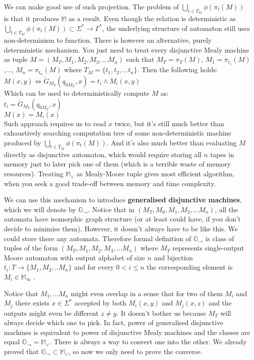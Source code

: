 \documentclass[12pt]{article}
\begin{document}
We can make good use of such projection. The problem of  $\bigcup_{t\in T_M} \phi(\pi_t(M))$ is that it produces $\mathbb{M}$ as a result. Even though the relation is deterministic as $\bigcup_{t\in T_M} \phi(\pi_t(M)) \subset \Sigma^* \rightarrow \Gamma^*$, the underlying structure of automaton still uses non-determinism to function. There is however an alternative, purely deterministic mechanism. You just need to treat every disjunctive Mealy machine as tuple $M = (M_T,M_1,M_2,M_3,...M_n)$ such that $M_T = \pi_T(M)$, $M_1 = \pi_{t_1}(M)$ ,..., $M_n = \pi_{t_n}(M)$ where $T_M = \{t_1,t_2,...t_n\}$. Then the following holds: \\
$M(x,y) \iff \check{G}_{M_T}(q_{0M_T},x) = t_i \wedge M_i(x,y)$ \\
Which can be used to deterministically compute $M$ as: \\
$t_i = \check{G}_{M_T}(q_{0M_T},x)$ \\
$M(x) = M_i(x)$ \\
Such approach requires us to read $x$ twice, but it's still much better than exhaustively searching computation tree of some non-deterministic machine produced by $\bigcup_{t\in T_M} \phi(\pi_t(M))$. And it's also much better than evaluating $M$ directly as disjunctive automaton, which would require storing all $n$ tapes in memory just to later pick one of them (which is a terrible waste of memory resources). Treating $\mathbb{M}_\vee$ as Mealy-Moore tuple gives most efficient algorithm, when you seek a good trade-off between memory and time complexity.

We can use this mechanism to introduce \textbf{generalised disjunctive machines}, which we will denote by $\mathbb{G}_\rightarrow$. Notice that in $(M_T,M_0,M_1,M_2,...M_n)$, all the automata have isomorphic graph structure (or at least could have, if you don't decide to minimise them). However, it doesn't always have to be like this. We could store there any automata. Therefore formal definition of $\mathbb{ G}_\rightarrow$ is class of tuples of the form $(M_T,M_1,M_2,M_3,...M_n)$ where $M_T$ represents single-output Moore automaton with output alphabet of size $n$ and bijection $t_i : T \rightarrow \{M_1,M_2,..M_n\}$ and for every $0<i\le n$ the corresponding element is $M_i \in \mathbb{ M}_\infty$ .

Notice that $M_1,...M_n$ might even overlap in a sense that for two of them $M_i$ and $M_j$ there exists $x\in\Sigma^*$ accepted by both $M_i(x,y)$ and $M_j(x,z)$ and the outputs might even be different $z\ne y$. It doesn't bother us because $M_T$ will always decide which one to pick. In fact, power of generalised disjunctive machines is equivalent to power of disjunctive Mealy machines and the classes are equal $\mathbb{G}_\rightarrow = \mathbb{M}_\vee$. There is always a way to convert one into the other. We already proved that  $\mathbb{G}_\rightarrow \subset \mathbb{M}_\vee$, so now we only need to prove the converse.
\end{document}
